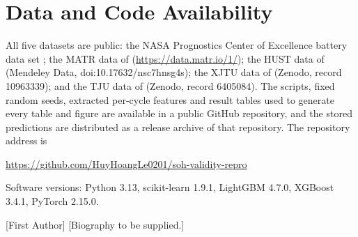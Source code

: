 \documentclass{ieeeaccess}
\begin{document}
\section*{Data and Code Availability}
All five datasets are public: the NASA Prognostics Center of Excellence battery data set \cite{saha2007}; the MATR data of \cite{severson2019} (\url{https://data.matr.io/1/}); the HUST data of \cite{ma2022} (Mendeley Data, doi:10.17632/nsc7hnsg4s); the XJTU data of \cite{wang2024} (Zenodo, record 10963339); and the TJU data of \cite{zhu2022} (Zenodo, record 6405084). The scripts, fixed random seeds, extracted per-cycle features and result tables used to generate every table and figure are available in a public GitHub repository, and the stored predictions are distributed as a release archive of that repository. The repository address is
\begin{center}\small\url{https://github.com/HuyHoangLe0201/soh-validity-repro}\end{center} Software versions: Python 3.13, scikit-learn 1.9.1, LightGBM 4.7.0, XGBoost 3.4.1, PyTorch 2.15.0.




\begin{IEEEbiographynophoto}{[First Author]}
[Biography to be supplied.]
\end{IEEEbiographynophoto}

\EOD
\end{document}
